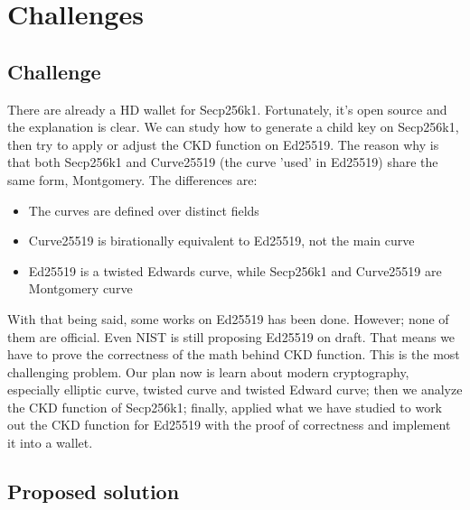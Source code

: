 \chapter{Challenges} \label{chap:Challenges}

\section{Challenge}
There are already a HD wallet for Secp256k1. Fortunately, it's open source and the explanation is clear. We can study how to generate a child key on Secp256k1, then try to apply or adjust the CKD function on Ed25519. The reason why is that both Secp256k1 and Curve25519 (the curve 'used' in Ed25519) share the same form, Montgomery. The differences are:

\begin{itemize}
    \item The curves are defined over distinct fields
    \item Curve25519 is birationally equivalent to Ed25519, not the main curve
    \item Ed25519 is a twisted Edwards curve, while Secp256k1 and Curve25519 are \\ Montgomery curve
\end{itemize}

With that being said, some works on Ed25519 has been done. However; none of them are official. Even NIST is still proposing Ed25519 on draft. That means we have to prove the correctness of the math behind CKD function. This is the most challenging problem. Our plan now is learn about modern cryptography, especially elliptic curve, twisted curve and twisted Edward curve; then we analyze the CKD function of Secp256k1; finally, applied what we have studied to work out the CKD function for Ed25519 with the proof of correctness and implement it into a wallet.


\section{Proposed solution}
